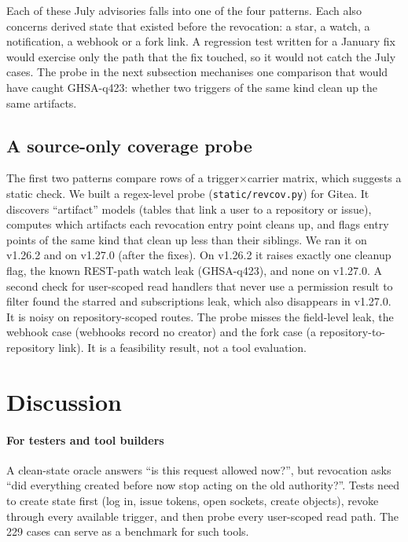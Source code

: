 \documentclass[preprint,12pt]{elsarticle}
\begin{document}
Each of these July advisories falls into one of the four patterns. Each also concerns derived state that existed before the
revocation: a star, a watch, a notification, a webhook or a fork link. A regression test written for a January fix would
exercise only the path that the fix touched, so it would not catch the July cases. The probe in the next
subsection mechanises one comparison that would have caught GHSA-q423: whether two triggers of the same kind clean up the same artifacts.

\subsection{A source-only coverage probe}
The first two patterns compare rows of a trigger$\times$carrier matrix, which suggests a static check. We
built a regex-level probe (\texttt{static/revcov.py}) for Gitea. It discovers ``artifact'' models (tables
that link a user to a repository or issue), computes which artifacts each revocation entry point cleans up,
and flags entry points of the same kind that clean up less than their siblings. We ran it on v1.26.2 and on v1.27.0 (after the fixes).
On v1.26.2 it raises exactly one cleanup flag, the known REST-path watch leak (GHSA-q423), and none on
v1.27.0. A second check for user-scoped read handlers that never use a permission result to filter
found the starred and subscriptions leak, which also disappears in v1.27.0. It is noisy on repository-scoped
routes. The probe misses the field-level leak, the webhook case (webhooks record no creator) and the fork case (a
repository-to-repository link). It is a feasibility result, not a tool evaluation.

\section{Discussion}

\paragraph{For testers and tool builders}
A clean-state oracle answers ``is this request allowed now?'', but revocation asks ``did everything created
before now stop acting on the old authority?''. Tests need to create state first (log in, issue tokens,
open sockets, create objects), revoke through every available trigger, and then probe every user-scoped read
path. The 229 cases can serve as a benchmark for such tools.
\end{document}
